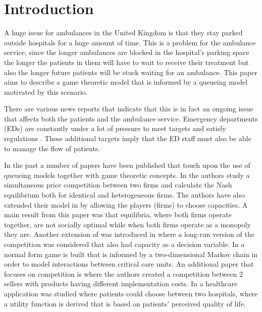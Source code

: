 \section{Introduction}

A huge issue for ambulances in the United Kingdom is that they stay 
parked outside hospitals for a huge amount of time. 
This is a problem for the ambulance service, since the longer ambulances are
blocked in the hospital's parking space the longer the patients in them will
have to wait to receive their treatment but also the longer future patients 
will be stuck waiting for an ambulance.
This paper aims to describe a game theoretic model that is informed by a 
queueing model motivated by this scenario.

There are various news reports that indicate that this is in fact an ongoing 
issue that affects both the patients and the ambulance service.
Emergency departments (EDs) are constantly under a lot of pressure to meet 
targets and satisfy regulations \cite{EmergencyDepartmentWinterPressures}.
These additional targets imply that the ED staff must also be able to manage 
the flow of patients.

In the past a number of papers have been published that touch upon the use of 
queueing models together with game theoretic concepts.
In \cite{FirmCompetition} the authors study a simultaneous price competition 
between two firms and calculate the Nash equilibrium both for identical and 
heterogeneous firms. 
The authors have also extended their model in \cite{FirmCompetition2} by 
allowing the players (firms) to choose capacities. 
A main result from this paper was that equilibria, where both firms operate
together, are not socially optimal while when both firms operate as a monopoly 
they are.
Another extension of \cite{FirmCompetition} was introduced in 
\cite{FirmCompetitionExtension} where a long-run version of the competition was 
considered that also had capacity as a decision variable.
In \cite{knight2017measuring} a normal form game is built that is informed by a 
two-dimensional Markov chain in order to model interactions between critical
care units.
An additional paper that focuses on competition is \cite{fan2009short} where
the authors created a competition between 2 sellers with products having 
different implementation costs.
In \cite{sadat2015can} a healthcare application was studied where patients 
could choose between two hospitals, where a utility function is derived that is
based on patients' perceived quality of life.

